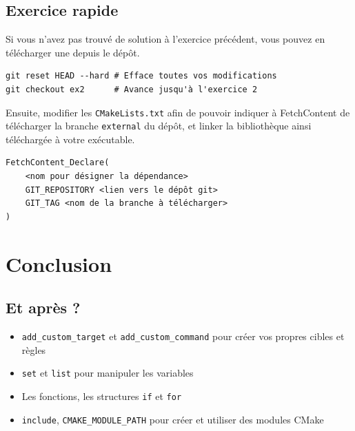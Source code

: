 \documentclass{beamer}
\newenvironment{Frame}{\begin{frame}[containsverbatim]{\subsecname}}{\end{frame}}
\begin{document}
\subsection{Exercice rapide}

\begin{Frame}
    Si vous n'avez pas trouvé de solution à l'exercice précédent, vous pouvez en télécharger une depuis le dépôt.
\begin{verbatim}
git reset HEAD --hard # Efface toutes vos modifications
git checkout ex2      # Avance jusqu'à l'exercice 2
\end{verbatim}

   Ensuite, modifier les \texttt{CMakeLists.txt} afin de pouvoir indiquer à FetchContent de télécharger la branche \texttt{external} du dépôt, et linker la bibliothèque ainsi téléchargée à votre exécutable.
   \begin{verbatim}
FetchContent_Declare(
    <nom pour désigner la dépendance>
    GIT_REPOSITORY <lien vers le dépôt git>
    GIT_TAG <nom de la branche à télécharger>
)
   \end{verbatim}
\end{Frame}

\section{Conclusion}

\subsection{Et après ?}

\begin{Frame}
    \begin{itemize}
        \item \verb|add_custom_target| et \verb|add_custom_command| pour créer vos propres cibles et règles
        \item \verb|set| et \verb|list| pour manipuler les variables
        \item Les fonctions, les structures \verb|if| et \verb|for|
        \item \verb|include|, \verb|CMAKE_MODULE_PATH| pour créer et utiliser des modules CMake
    \end{itemize}
\end{Frame}
\end{document}
